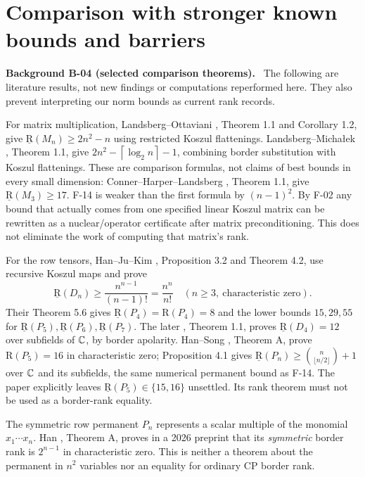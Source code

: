\documentclass[11pt]{article}
\newcommand{\BR}{\underline{\mathrm R}}\newcommand{\TR}{\mathrm R}
\newcommand{\ceil}[1]{\left\lceil#1\right\rceil}
\newenvironment{background}[2]{\par\medskip\noindent\textbf{Background #1 (#2).}\ }{\par\medskip}
\begin{document}
\section{Comparison with stronger known bounds and barriers}
\begin{background}{B-04}{selected comparison theorems}
The following are literature results, not new findings or computations
reperformed here. They also prevent interpreting our norm bounds as
current rank records.
\end{background}

For matrix multiplication, Landsberg--Ottaviani \cite{LO},
Theorem 1.1 and Corollary 1.2, give
$\BR(M_n)\geq2n^2-n$ using restricted Koszul flattenings.
Landsberg--Micha{\l}ek \cite{LM}, Theorem 1.1, give
$2n^2-\ceil{\log_2n}-1$, combining border substitution with
Koszul flattenings. These are comparison formulas, not claims of
best bounds in every small dimension: Conner--Harper--Landsberg
\cite{CHL}, Theorem 1.1, give $\BR(M_3)\geq17$.
F-14 is weaker than the first formula by $(n-1)^2$.
By F-02 any bound that actually comes from one specified linear
Koszul matrix can be rewritten as a nuclear/operator certificate
after matrix preconditioning. This does not eliminate the work of
computing that matrix's rank.

For the row tensors, Han--Ju--Kim \cite{HJK},
Proposition 3.2 and Theorem 4.2, use recursive Koszul maps and prove
\[
 \BR(D_n)\geq\frac{n^{n-1}}{(n-1)!}=\frac{n^n}{n!}
 \quad(n\geq3,\ \text{characteristic zero}).
\]
Their Theorem 5.6 gives $\BR(P_4)=\TR(P_4)=8$ and the lower bounds
$15,29,55$ for $\BR(P_5),\BR(P_6),\BR(P_7)$.
The later \cite{HJK4}, Theorem 1.1, proves $\BR(D_4)=12$
over subfields of $\mathbb C$, by border apolarity.
Han--Song \cite{HS}, Theorem A, prove $\TR(P_5)=16$ in
characteristic zero; Proposition 4.1 gives
$\BR(P_n)\geq\binom n{\lfloor n/2\rfloor}+1$ over $\mathbb C$ and
its subfields, the same numerical permanent bound as F-14.
The paper explicitly leaves $\BR(P_5)\in\{15,16\}$ unsettled.
Its rank theorem must not be used as a border-rank equality.

The symmetric row permanent $P_n$ represents a scalar multiple of
the monomial $x_1\cdots x_n$. Han \cite{Han}, Theorem A,
proves in a 2026 preprint that its \emph{symmetric} border rank is
$2^{n-1}$ in characteristic zero. This is neither a theorem about
the permanent in $n^2$ variables nor an equality for ordinary
CP border rank.
\end{document}
